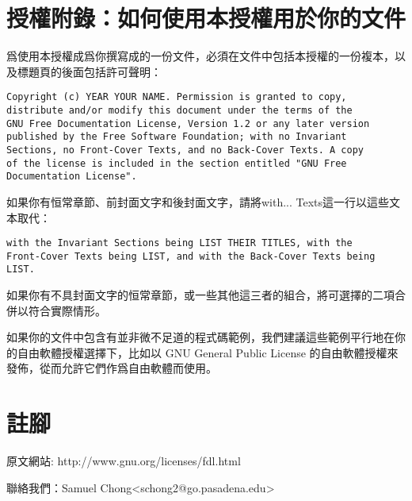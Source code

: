 \section{授權附錄：如何使用本授權用於你的文件}
爲使用本授權成爲你撰寫成的一份文件，必須在文件中包括本授權的一份複本，以及標題頁的後面包括許可聲明：
\begin{verbatim}
Copyright (c) YEAR YOUR NAME. Permission is granted to copy, 
distribute and/or modify this document under the terms of the 
GNU Free Documentation License, Version 1.2 or any later version 
published by the Free Software Foundation; with no Invariant 
Sections, no Front-Cover Texts, and no Back-Cover Texts. A copy 
of the license is included in the section entitled "GNU Free 
Documentation License".
\end{verbatim}
如果你有恒常章節、前封面文字和後封面文字，請將with... Texts這一行以這些文本取代：
\begin{verbatim}
with the Invariant Sections being LIST THEIR TITLES, with the 
Front-Cover Texts being LIST, and with the Back-Cover Texts being LIST.
\end{verbatim}
如果你有不具封面文字的恒常章節，或一些其他這三者的組合，將可選擇的二項合併以符合實際情形。\par
如果你的文件中包含有並非微不足道的程式碼範例，我們建議這些範例平行地在你的自由軟體授權選擇下，比如以 GNU General Public License 的自由軟體授權來發佈，從而允許它們作爲自由軟體而使用。
\section{註腳}
原文網站: http://www.gnu.org/licenses/fdl.html\par
聯絡我們：Samuel Chong<schong2@go.pasadena.edu>